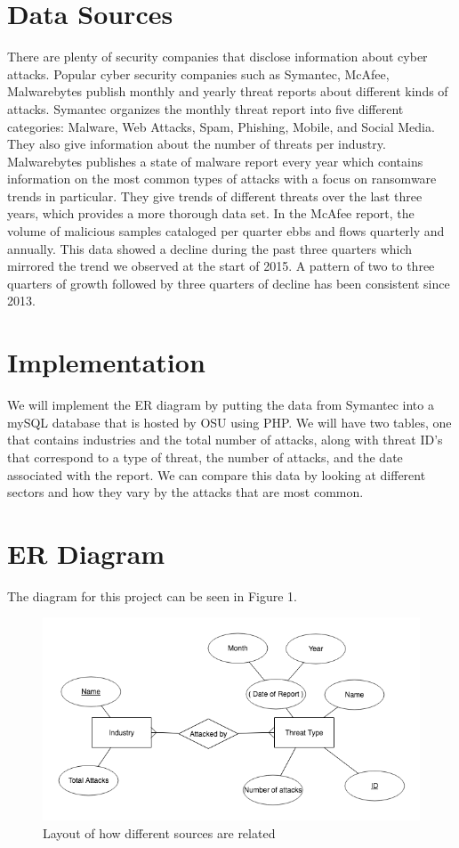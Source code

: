 \documentclass[journal]{vgtc}                %
\begin{document}
\section{Data Sources}
There are plenty of security companies that disclose information about cyber attacks. 
Popular cyber security companies such as Symantec, McAfee, Malwarebytes publish monthly and yearly threat reports about different kinds of attacks. 
Symantec organizes the monthly threat report into five different categories: Malware, Web Attacks, Spam, Phishing, Mobile, and Social Media. 
They also give information about the number of threats per industry. \cite{SMR}
Malwarebytes publishes a state of malware report every year which contains information on the most common types of attacks with a focus on ransomware trends in particular. 
They give trends of different threats over the last three years, which provides a more thorough data set. \cite{MWB}
In the McAfee report, the volume of malicious samples cataloged per quarter ebbs and flows quarterly and annually. 
This data showed a decline during the past three quarters which mirrored the trend we observed at the start of 2015. 
A pattern of two to three quarters of growth followed by three quarters of decline has been consistent since 2013. \cite{QT17}

\section{Implementation}
We will implement the ER diagram by putting the data from Symantec into a mySQL database that is hosted by OSU using PHP.
We will have two tables, one that contains industries and the total number of attacks, along with threat ID’s that correspond to a type of threat, the number of attacks, and the date associated with the report. 
We can compare this data by looking at different sectors and how they vary by the attacks that are most common.

\section{ER Diagram}
The diagram for this project can be seen in Figure 1.
\begin{figure}[tb]
 \centering %
 \includegraphics[width=\columnwidth]{erdigram}
 \caption{Layout of how different sources are related}
 \label{fig:sample}
\end{figure}
\end{document}
